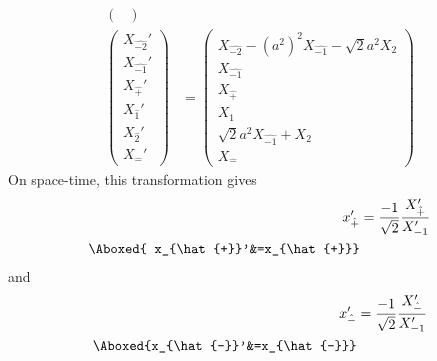 \documentclass[]{article}
\numberwithin{equation}{section}
\begin{document}
{{\begin{align}
\begin{pmatrix}
    \end{pmatrix}\\
    \begin{pmatrix}
    {X}_{\hat{-2}}'\\
    {X}_{\hat{-1}}'\\
    {X}_{\hat{+}}'\\
    {X}_{\hat{1}}'\\
    {X}_{\hat{2}}'\\
    {X}_{\hat{-}}'
    \end{pmatrix}&= \begin{pmatrix}
    {X}_{\hat{-2}}-(a^{2})^{2} {X}_{\hat{-1}}-\sqrt{2}a^{2}{X}_{2}\\
    {X}_{\hat{-1}}\\
    {X}_{\hat{+}}\\
    {X}_{1}\\
    \sqrt{2}a^{2} {X}_{\hat{-1}}+{X}_{2}\\
    {X}_{\hat{-}}
    \end{pmatrix}
\end{align}
On space-time, this transformation gives
\begin{align}
    x_{\hat{+}}'&=\frac{-1}{\sqrt{2}}\frac{{X}_{{\hat{+}}}'}{ {X}_{-1}'}\\
    \Aboxed{ x_{\hat{+}}'&=x_{\hat{+}}}
\end{align}
and
\begin{align}
    x_{\hat{-}}'&=\frac{-1}{\sqrt{2}}\frac{{X}_{\hat{-}}'}{ {X}_{-1}'}\\
    \Aboxed{x_{\hat{-}}'&=x_{\hat{-}}}
\end{align}

}}
\end{document}
